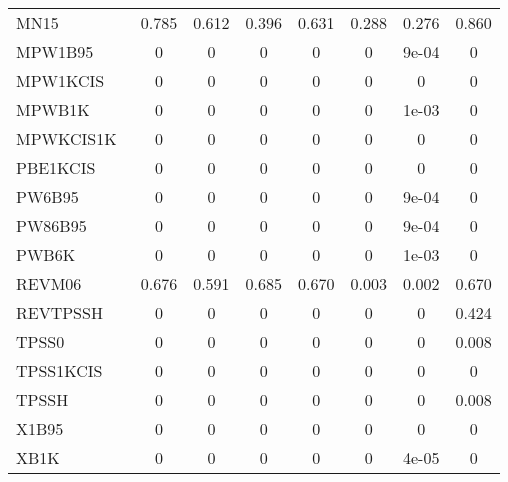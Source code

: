 \begin{table*}
\begin{tabular}{|l|c|c|c|c|c|c|c|}
MN15~\cite{Yu2016_5032} & 0.785 & 0.612 & 0.396 & 0.631 & 0.288 & 0.276 & 0.860 \\
MPW1B95~\cite{Zhao2004_6908} & 0 & 0 & 0 & 0 & 0 & 9e-04 & 0 \\
MPW1KCIS~\cite{Zhao2005_2012} & 0 & 0 & 0 & 0 & 0 & 0 & 0 \\
MPWB1K~\cite{Zhao2004_6908} & 0 & 0 & 0 & 0 & 0 & 1e-03 & 0 \\
MPWKCIS1K~\cite{Zhao2005_2012} & 0 & 0 & 0 & 0 & 0 & 0 & 0 \\
PBE1KCIS~\cite{Zhao2005_415} & 0 & 0 & 0 & 0 & 0 & 0 & 0 \\
PW6B95~\cite{Zhao2005_5656} & 0 & 0 & 0 & 0 & 0 & 9e-04 & 0 \\
PW86B95~\cite{Becke1996_1040} & 0 & 0 & 0 & 0 & 0 & 9e-04 & 0 \\
PWB6K~\cite{Zhao2005_5656} & 0 & 0 & 0 & 0 & 0 & 1e-03 & 0 \\
REVM06~\cite{Wang2018_10257} & 0.676 & 0.591 & 0.685 & 0.670 & 0.003 & 0.002 & 0.670 \\
REVTPSSH~\cite{Csonka2010_3688} & 0 & 0 & 0 & 0 & 0 & 0 & 0.424 \\
TPSS0~\cite{Grimme2005_3067} & 0 & 0 & 0 & 0 & 0 & 0 & 0.008 \\
TPSS1KCIS~\cite{Zhao2005_43} & 0 & 0 & 0 & 0 & 0 & 0 & 0 \\
TPSSH~\cite{Staroverov2003_12129} & 0 & 0 & 0 & 0 & 0 & 0 & 0.008 \\
X1B95~\cite{Zhao2004_6908} & 0 & 0 & 0 & 0 & 0 & 0 & 0 \\
XB1K~\cite{Zhao2004_6908} & 0 & 0 & 0 & 0 & 0 & 4e-05 & 0 \\
\bottomrule
\end{tabular}
\end{table*}
